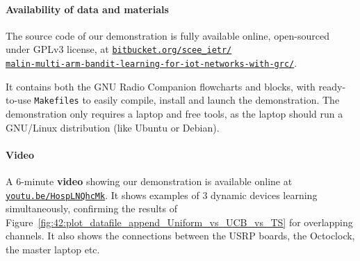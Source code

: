 \paragraph{Availability of data and materials}
%
The source code of our demonstration is fully available online, open-sourced under GPLv3 license, at
\href{https://bitbucket.org/scee_ietr/malin-multi-arm-bandit-learning-for-iot-networks-with-grc}{\texttt{bitbucket.org/scee\_ietr/\\malin-multi-arm-bandit-learning-for-iot-networks-with-grc/}}.

It contains both the GNU Radio Companion flowcharts and blocks, with ready-to-use \texttt{Makefiles} to easily compile, install and launch the demonstration.
The demonstration only requires a laptop and free tools,
as the laptop should run a GNU/Linux distribution (like Ubuntu or Debian).

\paragraph{Video}
%
A $6$-minute \textbf{video} showing our demonstration is available online at \texttt{\url{youtu.be/HospLNQhcMk}}.
It shows examples of $3$ dynamic devices learning simultaneously, confirming the results of Figure~\ref{fig:42:plot_datafile_append_Uniform_vs_UCB_vs_TS} for overlapping channels.
It also shows the connections between the USRP boards, the Octoclock, the master laptop etc.

